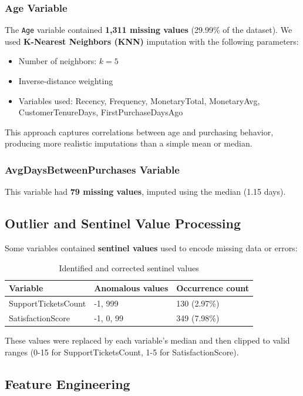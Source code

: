 \documentclass[12pt,a4paper]{article}
\begin{document}
\subsubsection{Age Variable}
The \texttt{Age} variable contained \textbf{1,311 missing values} (29.99\% of the dataset). We used \textbf{K-Nearest Neighbors (KNN)} imputation with the following parameters:
\begin{itemize}
    \item Number of neighbors: $k = 5$
    \item Inverse-distance weighting
    \item Variables used: Recency, Frequency, MonetaryTotal, MonetaryAvg, CustomerTenureDays, FirstPurchaseDaysAgo
\end{itemize}

This approach captures correlations between age and purchasing behavior, producing more realistic imputations than a simple mean or median.

\subsubsection{AvgDaysBetweenPurchases Variable}
This variable had \textbf{79 missing values}, imputed using the median (1.15 days).

\subsection{Outlier and Sentinel Value Processing}

Some variables contained \textbf{sentinel values} used to encode missing data or errors:

\begin{table}[H]
\centering
\begin{tabular}{lll}
\toprule
\textbf{Variable} & \textbf{Anomalous values} & \textbf{Occurrence count} \\
\midrule
SupportTicketsCount & -1, 999 & 130 (2.97\%) \\
SatisfactionScore & -1, 0, 99 & 349 (7.98\%) \\
\bottomrule
\end{tabular}
\caption{Identified and corrected sentinel values}
\end{table}

These values were replaced by each variable's median and then clipped to valid ranges (0-15 for SupportTicketsCount, 1-5 for SatisfactionScore).

\subsection{Feature Engineering}
\end{document}
